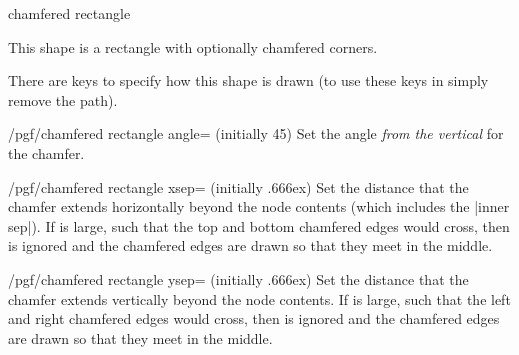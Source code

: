 \begin{shape}{chamfered rectangle}

	This shape is a rectangle with optionally chamfered corners.
	
\begin{codeexample}[]
\end{codeexample}

	There are \pgfname{} keys to specify how this shape is drawn (to use
	these keys in \tikzname{} simply remove the  path).

\begin{key}{/pgf/chamfered rectangle angle= (initially 45)}
	Set the angle \emph{from the vertical} for the chamfer.
	
\begin{codeexample}[]
\end{codeexample}
\end{key}

\begin{key}{/pgf/chamfered rectangle xsep= (initially .666ex)}
	Set the distance that the chamfer extends horizontally beyond the node 
	contents (which includes the |inner sep|). 
	If  is large, such
	that the top and bottom chamfered edges would cross, then 
	 is ignored and the chamfered edges are drawn so that
	they meet in the middle.

\begin{codeexample}[]
\end{codeexample}
	
\end{key}

\begin{key}{/pgf/chamfered rectangle ysep= (initially .666ex)}
	Set the distance that the chamfer extends vertically beyond the node 
	contents. 
	If  is large, such that the left and right chamfered 
	edges would cross, then  is ignored and the chamfered 
	edges are drawn so that	they meet in the middle.
\end{key}


\end{shape}
